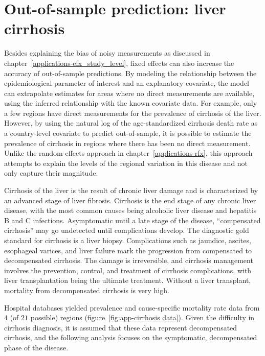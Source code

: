 \chapter{Out-of-sample prediction: liver cirrhosis}
\label{applications-efx_country_level}

Besides explaining the bias of noisy measurements as discussed in
chapter~\ref{applications-efx_study_level}, fixed effects can also
increase the accuracy of out-of-sample predictions.  By modeling the
relationship between the epidemiological parameter of interest and an
explanatory covariate, the model can extrapolate estimates for areas
where no direct measurements are available, using the inferred
relationship with the known covariate data.  For example, only a few
regions have direct measurements for the prevalence of cirrhosis of
the liver.  However, by using the natural log of the age-standardized
cirrhosis death rate as a country-level covariate to predict
out-of-sample, it is possible to estimate the prevalence of cirrhosis
in regions where there has been no direct measurement.  Unlike the
random-effects approach in chapter~\ref{applications-rfx}, this
approach attempts to explain the levels of the regional variation in
this disease and not only capture their magnitude.

Cirrhosis of the liver is the result of chronic liver damage and is
characterized by an advanced stage of liver fibrosis.  Cirrhosis is
the end stage of any chronic liver disease, with the most common
causes being alcoholic liver disease and hepatitis B and C infections.
Asymptomatic until a late stage of the disease, ``compensated
cirrhosis'' may go undetected until complications develop.  The
diagnostic gold standard for cirrhosis is a liver biopsy.
Complications such as jaundice, ascites, esophageal varices,
and liver failure mark the progression
from compensated to decompensated cirrhosis.  The damage is irreversible, and cirrhosis
management involves the prevention, control, and treatment of cirrhosis
complications, with liver transplantation being the ultimate
treatment.  Without a liver transplant, mortality from decompensated
cirrhosis is very high. \cite{garcia-tsao_management_2009,
  damico_natural_2006, schuppan_liver_2008}

Hospital databases yielded prevalence and cause-specific mortality rate
data from $4$ (of $21$ possible) regions (figure~\ref{fig:app-cirrhosis data}).
Given the difficulty in
cirrhosis diagnosis, it is assumed that these data represent decompensated
cirrhosis, and the following analysis focuses on the symptomatic,
decompensated phase of the disease.

